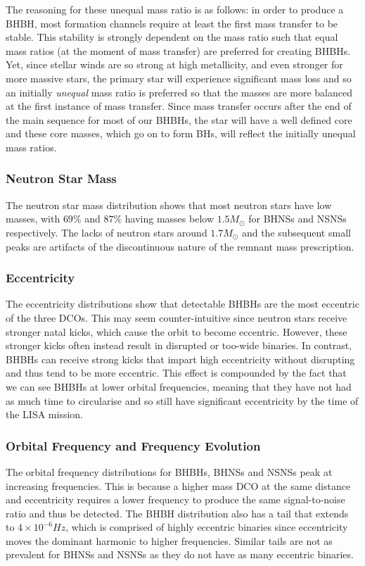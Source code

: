The reasoning for these unequal mass ratio is as follows: in order to produce a BHBH, most formation channels require at least the first mass transfer to be stable. This stability is strongly dependent on the mass ratio such that equal mass ratios (at the moment of mass transfer) are preferred for creating BHBHs. Yet, since stellar winds are so strong at high metallicity, and even stronger for more massive stars, the primary star will experience significant mass loss and so an initially \textit{unequal} mass ratio is preferred so that the masses are more balanced at the first instance of mass transfer. Since mass transfer occurs after the end of the main sequence for most of our BHBHs, the star will have a well defined core and these core masses, which go on to form BHs, will reflect the initially unequal mass ratios.

\subsubsection{Neutron Star Mass}
The neutron star mass distribution shows that most neutron stars have low masses, with $69\%$ and $87\%$ having masses below $1.5 \unit{M_{\odot}}$ for BHNSs and NSNSs respectively. The lacks of neutron stars around $1.7 \unit{M_{\odot}}$ and the subsequent small peaks are artifacts of the discontinuous nature of the \citet{Fryer+2012} remnant mass prescription.

\subsubsection{Eccentricity}
The eccentricity distributions show that detectable BHBHs are the most eccentric of the three DCOs. This may seem counter-intuitive since neutron stars receive stronger natal kicks, which cause the orbit to become eccentric. However, these stronger kicks often instead result in disrupted or too-wide binaries. In contrast, BHBHs can receive strong kicks that impart high eccentricity without disrupting and thus tend to be more eccentric. This effect is compounded by the fact that we can see BHBHs at lower orbital frequencies, meaning that they have not had as much time to circularise and so still have significant eccentricity by the time of the LISA mission.

\subsubsection{Orbital Frequency and Frequency Evolution}
The orbital frequency distributions for BHBHs, BHNSs and NSNSs peak at increasing frequencies. This is because a higher mass DCO at the same distance and eccentricity requires a lower frequency to produce the same signal-to-noise ratio and thus be detected. The BHBH distribution also has a tail that extends to $4 \times 10^{-6} \unit{Hz}$, which is comprised of highly eccentric binaries since eccentricity moves the dominant harmonic to higher frequencies. Similar tails are not as prevalent for BHNSs and NSNSs as they do not have as many eccentric binaries.

